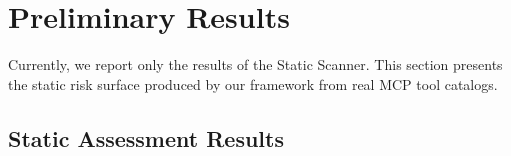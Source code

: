 \documentclass[sigconf]{acmart}
\begin{document}





\section{Preliminary Results}
\label{sec:results}

Currently, we report only the results of the Static Scanner. This section presents the static risk surface produced by our framework from real MCP tool catalogs.

\subsection{Static Assessment Results}
\end{document}
